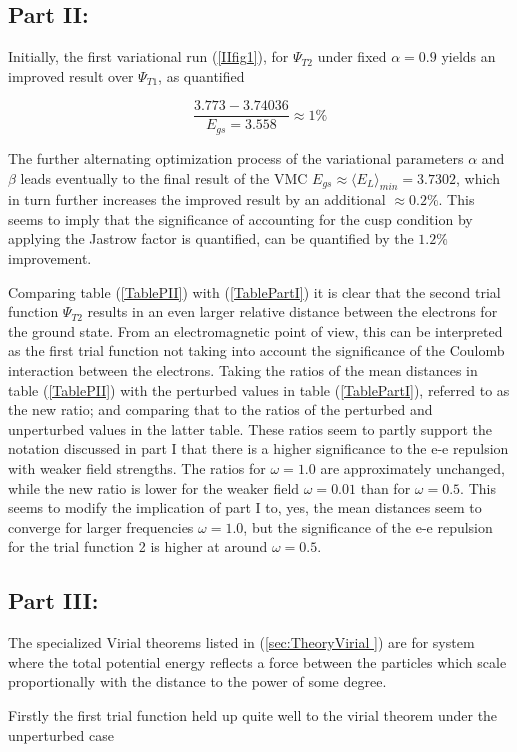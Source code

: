 \documentclass[aip,nobalancelastpage,
twocolumn,
rsi,%
 amsmath,amssymb,
 reprint,%
]{revtex4}
\begin{document}
\subsection{Part II:}
Initially, the first variational run (\ref{IIfig1}), for $\Psi_{T2}$ under fixed $\alpha=0.9$ yields an improved result over $\Psi_{T1}$, as quantified

\begin{equation}
\frac{3.773-3.74036}{E_{gs}=3.558}\approx 1\%
\end{equation}

The further alternating optimization process of the variational parameters $\alpha$ and $\beta$ leads eventually to the final result of the VMC $E_{gs} \approx \langle E_L\rangle_{min}=3.7302$, which in turn further increases the improved result by an additional $\approx 0.2\%$. This seems to imply that the significance of accounting for the cusp condition by applying the Jastrow factor is quantified, can be quantified by the $1.2\%$ improvement.	\par

Comparing table (\ref{TablePII}) with (\ref{TablePartI}) it is clear that the second trial function $\Psi_{T2}$ results in an even larger relative distance between the electrons for the ground state. From an electromagnetic point of view, this can be interpreted as the first trial function not taking into account the significance of the Coulomb interaction between the electrons. 	Taking the ratios of the mean distances in table (\ref{TablePII}) with the perturbed values in table (\ref{TablePartI}), referred to as the new ratio; and comparing that to the ratios of the perturbed and unperturbed values in the latter table. These ratios seem to partly support the notation discussed in part I that there is a higher significance to the e-e repulsion with weaker field strengths. The ratios for $\omega = 1.0$ are approximately unchanged, while the new ratio is lower for the weaker field $\omega = 0.01$ than for $\omega =0.5$. This seems to modify the implication of part I to, yes, the mean distances seem to converge for larger frequencies $\omega=1.0$, but the significance of the e-e repulsion for the trial function 2 is higher at around $\omega=0.5$.

\subsection{Part III: }
The specialized Virial theorems listed in (\ref{sec:TheoryVirial }) are for system where the total potential energy reflects a force between the particles which scale proportionally with the distance to the power of some degree.\par
Firstly the first trial function held up quite well to the virial theorem under the unperturbed case
\end{document}
